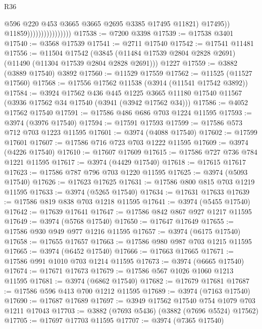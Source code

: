 \begin{lexlean}{R36}
\begin{coremodule}
                                          @596
                                          @220
                                          @453
                                          @3665
                                          @3665
                                          @2695
                                          @3385
                                          @17495
                                          @11821)
                                        @17495))
                                    @11859))))))))))))))))
@17538 := @7200 @3398
@17539 := @17538 @3401
@17540 := @3568 @17539
@17541 := @2711 @17540
@17542 := @17541 @11481
@17556 := @11504
    @17542
    (@3845 (@11484 @17539 @2804 @2828 @2691) (@11490 (@11304 @17539 @2804 @2828 @2691)))
    @1227
@17559 := @3882 (@3889 @17540) @3892
@17560 := @11529 @17559
@17562 := @11525 (@11527 @17560)
@17568 := @17556 @17562 @11538 (@3914 (@11541 @17542 @3892))
@17584 := @3924
    @17562
    @436
    @445
    @1225
    @3665
    @11180
    @17540
    @11567
    (@3936 @17562 @34 @17540 (@3941 (@3942 @17562 @34)))
@17586 := @4052 @17562 @17540
@17591 := @17586 @486 @686 @703 @1224 @11595
@17593 := @3974 (@3976 @17540)
@17594 := @17591 @17593
@17599 := @17586 @573 @712 @703 @1223 @11595
@17601 := @3974 (@4088 @17540)
@17602 := @17599 @17601
@17607 := @17586 @716 @723 @703 @1222 @11595
@17609 := @3974 (@4226 @17540)
@17610 := @17607 @17609
@17615 := @17586 @727 @736 @784 @1221 @11595
@17617 := @3974 (@4429 @17540)
@17618 := @17615 @17617
@17623 := @17586 @787 @796 @703 @1220 @11595
@17625 := @3974 (@5093 @17540)
@17626 := @17623 @17625
@17631 := @17586 @800 @815 @703 @1219 @11595
@17633 := @3974 (@5265 @17540)
@17634 := @17631 @17633
@17639 := @17586 @819 @838 @703 @1218 @11595
@17641 := @3974 (@5455 @17540)
@17642 := @17639 @17641
@17647 := @17586 @842 @867 @927 @1217 @11595
@17649 := @3974 (@5768 @17540)
@17650 := @17647 @17649
@17655 := @17586 @930 @949 @977 @1216 @11595
@17657 := @3974 (@6175 @17540)
@17658 := @17655 @17657
@17663 := @17586 @980 @987 @703 @1215 @11595
@17665 := @3974 (@6452 @17540)
@17666 := @17663 @17665
@17671 := @17586 @991 @1010 @703 @1214 @11595
@17673 := @3974 (@6665 @17540)
@17674 := @17671 @17673
@17679 := @17586 @567 @1026 @1060 @1213 @11595
@17681 := @3974 (@6862 @17540)
@17682 := @17679 @17681
@17687 := @17586 @596 @413 @700 @1212 @11595
@17689 := @3974 (@7163 @17540)
@17690 := @17687 @17689
@17697 := @3949 @17562 @17540 @754 @1079 @703 @1211 @17043
@17703 := @3882 (@7693 @5436) (@3882 (@7696 @5524) @17562)
@17705 := @17697 @17703 @11595
@17707 := @3974 (@7365 @17540)

\end{coremodule}
\end{lexlean}

